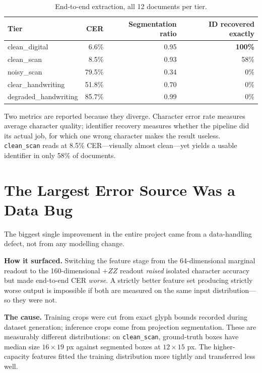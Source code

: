 \documentclass[11pt,a4paper]{article}
\begin{document}
\begin{table}[h]
\centering
\caption{End-to-end extraction, all 12 documents per tier.}
\begin{tabular}{@{}lrrr@{}}
\toprule
Tier & CER & Segmentation ratio & ID recovered exactly \\
\midrule
clean\_digital & 6.6\% & 0.95 & \textbf{100\%} \\
clean\_scan & 8.5\% & 0.93 & 58\% \\
noisy\_scan & 79.5\% & 0.34 & 0\% \\
clear\_handwriting & 51.8\% & 0.70 & 0\% \\
degraded\_handwriting & 85.7\% & 0.99 & 0\% \\
\bottomrule
\end{tabular}
\end{table}

Two metrics are reported because they diverge. Character error rate measures
average character quality; identifier recovery measures whether the pipeline did
its actual job, for which one wrong character makes the result useless.
\texttt{clean\_scan} reads at 8.5\% CER---visually almost clean---yet yields a
usable identifier in only 58\% of documents.


\section{The Largest Error Source Was a Data Bug}

The biggest single improvement in the entire project came from a data-handling
defect, not from any modelling change.

\textbf{How it surfaced.} Switching the feature stage from the 64-dimensional
marginal readout to the 160-dimensional $+ZZ$ readout \emph{raised} isolated
character accuracy but made end-to-end CER \emph{worse}. A strictly better
feature set producing strictly worse output is impossible if both are measured on
the same input distribution---so they were not.

\textbf{The cause.} Training crops were cut from exact glyph bounds recorded
during dataset generation; inference crops come from projection segmentation.
These are measurably different distributions: on \texttt{clean\_scan},
ground-truth boxes have median size $16\times19$ px against segmented boxes at
$12\times15$ px. The higher-capacity features fitted the training distribution
more tightly and transferred less well.
\end{document}
